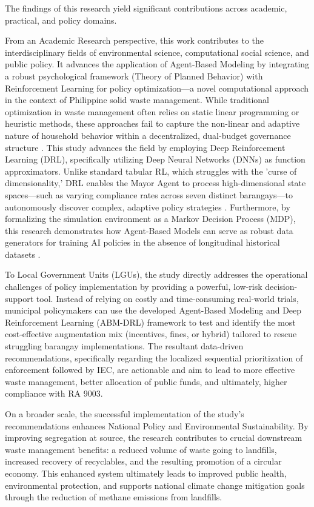 The findings of this research yield significant contributions across academic, practical, and policy domains.

From an Academic Research perspective, this work contributes to the interdisciplinary fields of environmental science, computational social science, and public policy. It advances the application of Agent-Based Modeling by integrating a robust psychological framework (Theory of Planned Behavior) with Reinforcement Learning for policy optimization—a novel computational approach in the context of Philippine solid waste management. While traditional optimization in waste management often relies on static linear programming or heuristic methods, these approaches fail to capture the non-linear and adaptive nature of household behavior within a decentralized, dual-budget governance structure \citep{TianReview2024}. This study advances the field by employing Deep Reinforcement Learning (DRL), specifically utilizing Deep Neural Networks (DNNs) as function approximators. Unlike standard tabular RL, which struggles with the 'curse of dimensionality,' DRL enables the Mayor Agent to process high-dimensional state spaces—such as varying compliance rates across seven distinct barangays—to autonomously discover complex, adaptive policy strategies \citep{Jimenez2025, HaMinh2025}. Furthermore, by formalizing the simulation environment as a Markov Decision Process (MDP), this research demonstrates how Agent-Based Models can serve as robust data generators for training AI policies in the absence of longitudinal historical datasets \citep{Kompella2020, Jimenez2025}.

To Local Government Units (LGUs), the study directly addresses the operational challenges of policy implementation by providing a powerful, low-risk decision-support tool. Instead of relying on costly and time-consuming real-world trials, municipal policymakers can use the developed Agent-Based Modeling and Deep Reinforcement Learning (ABM-DRL) framework to test and identify the most cost-effective augmentation mix (incentives, fines, or hybrid) tailored to rescue struggling barangay implementations. The resultant data-driven recommendations, specifically regarding the localized sequential prioritization of enforcement followed by IEC, are actionable and aim to lead to more effective waste management, better allocation of public funds, and ultimately, higher compliance with RA 9003.

On a broader scale, the successful implementation of the study's recommendations enhances National Policy and Environmental Sustainability. By improving segregation at source, the research contributes to crucial downstream waste management benefits: a reduced volume of waste going to landfills, increased recovery of recyclables, and the resulting promotion of a circular economy. This enhanced system ultimately leads to improved public health, environmental protection, and supports national climate change mitigation goals through the reduction of methane emissions from landfills.

